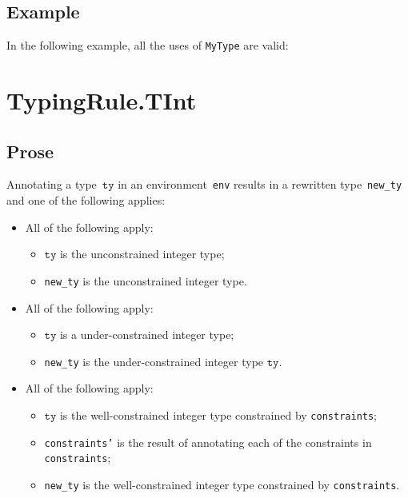 \documentclass{book}
\newcommand\tty[0]{\texttt{ty}}
\begin{document}
\begin{itemize}
\subsection{Example}
In the following example, all the uses of \texttt{MyType} are valid:






\section{TypingRule.TInt \label{sec:TypingRule.TInt}}

\subsection{Prose}
Annotating a type~$\tty$ in an environment~\texttt{env} results in a
rewritten type~\texttt{new\_ty} and one of the following applies:
\begin{itemize}
  \item All of the following apply:
    \begin{itemize}
      \item $\tty$ is the unconstrained integer type;
      \item \texttt{new\_ty} is the unconstrained integer type.
    \end{itemize}
  \item All of the following apply:
    \begin{itemize}
      \item $\tty$ is a under-constrained integer type;
      \item \texttt{new\_ty} is the under-constrained integer type $\tty$.
    \end{itemize}
  \item All of the following apply:
    \begin{itemize}
      \item $\tty$ is the well-constrained integer type constrained by
        \texttt{constraints};
      \item \texttt{constraints'} is the result of annotating each of the
        constraints in \texttt{constraints};
      \item \texttt{new\_ty} is the well-constrained integer type constrained
        by \texttt{constraints}.
    \end{itemize}
\end{itemize}


\end{itemize}
\end{document}
